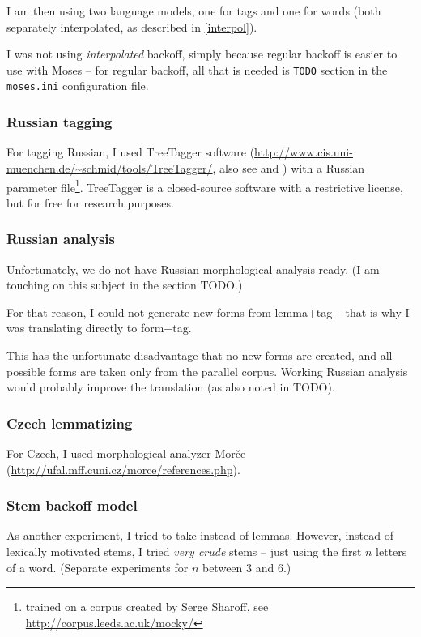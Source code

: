 I am then using two language models, one for tags and one for words (both separately interpolated, as described in \ref{interpol}).

I was not using \emph{interpolated} backoff, simply because regular backoff is easier to use with Moses -- for regular backoff, all that is needed is \texttt{TODO} section in the \texttt{moses.ini} configuration file.

\subsubsection{Russian tagging}

For tagging Russian, I used TreeTagger software (\url{http://www.cis.uni-muenchen.de/~schmid/tools/TreeTagger/}, also see \cite{treetagger1} and \cite{treetagger2}) with a Russian parameter file\footnote{trained on a corpus created by Serge Sharoff, see \url{http://corpus.leeds.ac.uk/mocky/}}. TreeTagger is a closed-source software with a restrictive license, but for free for research purposes.
\subsubsection{Russian analysis}

Unfortunately, we do not have Russian morphological analysis ready. (I am touching on this subject in the section TODO.)

For that reason, I could not generate new forms from lemma+tag -- that is why  I was translating directly to form+tag.

This has the unfortunate disadvantage that no new forms are created, and all possible forms are taken only from the parallel corpus. Working Russian analysis would probably improve the translation (as also noted in TODO).

\subsubsection{Czech lemmatizing}

For Czech, I used morphological analyzer Morče (\url{http://ufal.mff.cuni.cz/morce/references.php}).
\subsubsection{Stem backoff model}

As another experiment, I tried to take  instead of lemmas. However, instead of lexically motivated stems, I tried \emph{very crude} stems -- just using the first $n$ letters of a word. (Separate experiments for $n$ between 3 and 6.)


